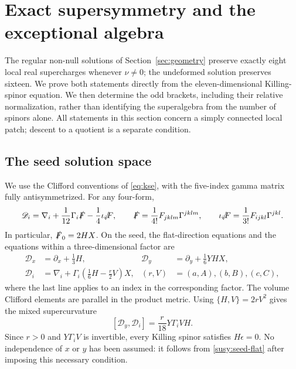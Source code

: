 \section{Exact supersymmetry and the exceptional algebra}\label{sec:susy}

The regular non-null solutions of Section~\ref{sec:geometry} preserve exactly eight local real supercharges whenever $\nu\ne0$; the undeformed solution preserves sixteen. We prove both statements directly from the eleven-dimensional Killing-spinor equation. We then determine the odd brackets, including their relative normalization, rather than identifying the superalgebra from the number of spinors alone. All statements in this section concern a simply connected local patch; descent to a quotient is a separate condition.

\subsection{The seed solution space}

We use the Clifford conventions of \eqref{eq:kse}, with the five-index gamma matrix fully antisymmetrized. For any four-form,
\begin{equation}\label{susy:slash}
 \mathscr D_i=\nabla_i+\frac1{12}\Gamma_i\slashed F
 -\frac14\slashed{\iota_iF},\qquad
 \slashed F=\frac1{4!}F_{jklm}\Gamma^{jklm},\qquad
 \slashed{\iota_iF}=\frac1{3!}F_{ijkl}\Gamma^{jkl}.
\end{equation}
In particular, $\slashed F_0=2HX$. On the seed, the flat-direction equations and the equations within a three-dimensional factor are
\begin{align}
 \mathscr D_x&=\partial_x+\frac13H,&
 \mathscr D_y&=\partial_y+\frac16YHX,\label{susy:seed-flat}\\
 \mathscr D_i&=\nabla_i+\Gamma_i\left(\frac16H-\frac r2V\right)X,
 & (r,V)&=(a,A),(b,B),(c,C),\label{susy:seed-factor}
\end{align}
where the last line applies to an index in the corresponding factor. The volume Clifford elements are parallel in the product metric. Using $\{H,V\}=2rV^2$ gives the mixed supercurvature
\begin{equation}\label{susy:seed-upper}
 [\mathscr D_y,\mathscr D_i]=\frac r{18}Y\Gamma_iVH.
\end{equation}
Since $r>0$ and $Y\Gamma_iV$ is invertible, every Killing spinor satisfies $H\epsilon=0$. No independence of $x$ or $y$ has been assumed: it follows from \eqref{susy:seed-flat} after imposing this necessary condition.

